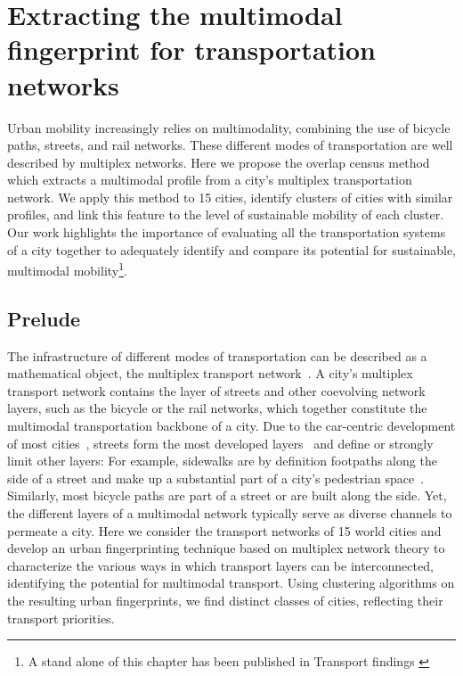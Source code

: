 \chapter{Extracting the multimodal fingerprint for transportation networks}

Urban mobility increasingly relies on multimodality, combining the use of bicycle paths, streets, and rail networks. These different modes of transportation are well described by multiplex networks. Here we propose the overlap census method which extracts a multimodal profile from a city's multiplex transportation network. We apply this method to 15 cities, identify clusters of cities with similar profiles, and link this feature to the level of sustainable mobility of each cluster. Our work highlights the importance of evaluating all the transportation systems of a city together to adequately identify and compare its potential for sustainable, multimodal mobility\footnote{A stand alone of this chapter has been published in Transport findings \cite{natera2020multimodal}}.


\section{Prelude}
The infrastructure of different modes of transportation can be described as a mathematical object, the multiplex transport network~\cite{Morris2012Transport,Strano2012Evolution,Barthelemy2013Evolution,Battiston2014Structural,Gallotti2014Efficiency,DeDomenico2014Navigability,Strano2015Features,Aleta2017Multilayer,Lee2017Morphology}. A city's multiplex transport network contains the layer of streets and other coevolving network layers, such as the bicycle or the rail networks, which together constitute the multimodal transportation backbone of a city. Due to the car-centric development of most cities~\cite{Jacobs1961Death}, streets form the most developed layers~\cite{Gossling2016Distribution,Szell2018Crowdsourced} and define or strongly limit other layers: For example, sidewalks are by definition footpaths along the side of a street and make up a substantial part of a city's pedestrian space~\cite{Gossling2016Distribution}. Similarly, most bicycle paths are part of a street or are built along the side. Yet, the different layers of a multimodal network typically serve as diverse channels to permeate a city. Here we consider the transport networks of 15 world cities and develop an urban fingerprinting technique based on multiplex network theory to characterize the various ways in which transport layers can be interconnected, identifying the potential for multimodal transport. Using clustering algorithms on the resulting urban fingerprints, we find distinct classes of cities, reflecting their transport priorities.

